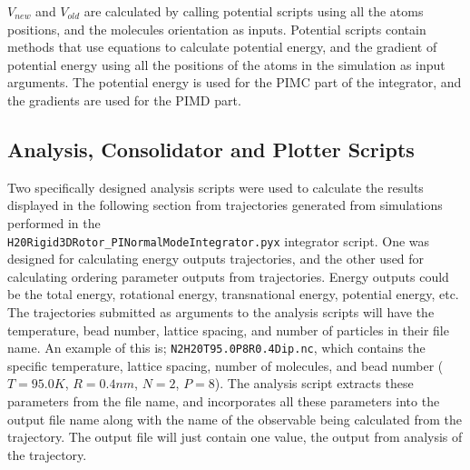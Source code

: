 \documentclass[11pt]{article}
\begin{document}
\begin{math} V_{new} \end{math} and \begin{math} V_{old} \end{math} are calculated by calling potential scripts using all the atoms positions, and the molecules orientation as inputs. Potential scripts contain methods that use equations to calculate potential energy, and the gradient of potential energy using all the positions of the atoms in the simulation as input arguments. The potential energy is used for the PIMC part of the integrator, and the gradients are used for the PIMD part.

\subsection{Analysis, Consolidator and Plotter Scripts}

Two specifically designed analysis scripts were used to calculate the results displayed in the following section from trajectories generated from simulations performed in the \\ \texttt{H20Rigid3DRotor\_PINormalModeIntegrator.pyx} integrator script. One was designed for calculating energy outputs trajectories, and the other used for calculating ordering parameter outputs from trajectories.  Energy outputs could be the total energy, rotational energy, transnational energy, potential energy, etc. The trajectories submitted as arguments to the analysis scripts will have the temperature, bead number, lattice spacing, and number of particles in their file name. An example of this is; \texttt{N2H20T95.0P8R0.4Dip.nc}, which contains the specific temperature, lattice spacing, number of molecules, and bead number (\begin{math} T = 95.0 K \end{math}, \begin{math} R = 0.4 nm \end{math}, \begin{math} N = 2 \end{math}, \begin{math} P = 8 \end{math}). The analysis script extracts these parameters from the file name, and incorporates all these parameters into the output file name along with the name of the observable being calculated from the trajectory. The output file will just contain one value, the output from analysis of the trajectory. 
\end{document}
